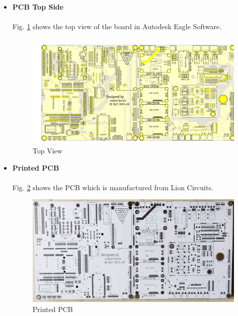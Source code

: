 \begin{itemize}[wide, labelwidth=!, labelindent=0pt]
    \item \textbf{PCB Top Side}
    \vspace{-0.5cm}
    \paragraph{} Fig. \ref{Top View} shows the top view of the board in Autodesk Eagle Software.

    \begin{figure}[H]
    \centering
    \includegraphics[width = 13cm]{project/images/top_view.png}
    \caption{Top View} \label{Top View}
    \end{figure}
    
    \item \textbf{Printed PCB}
    \vspace{-0.5cm}
    \paragraph{} Fig. \ref{Printed PCB} shows the PCB which is manufactured from Lion Circuits. 

    \begin{figure}[H]
    \centering
    \includegraphics[width = 13cm]{project/images/actual_pcb_resized.jpg}
    \caption{Printed PCB} \label{Printed PCB}
    \end{figure}

\end{itemize}

